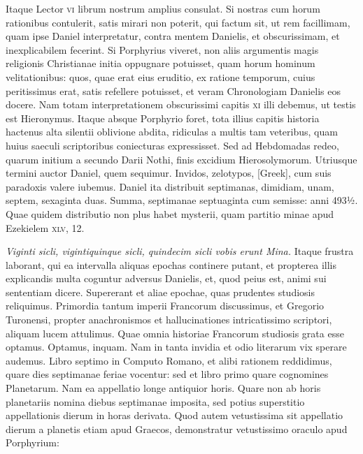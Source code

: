 \begin{parnumbers}
{}
\lnr{}Itaque
Lector \textsc{vi} librum nostrum amplius consulat.
\lnr{}Si nostras cum horum
rationibus contulerit, satis mirari non poterit, qui factum
sit, ut rem facillimam, quam ipse Daniel interpretatur, contra mentem
Danielis, et obscurissimam, et inexplicabilem fecerint.
\lnr{}Si Porphyrius
viveret, non aliis argumentis magis religionis Christianae
initia oppugnare potuisset, quam horum hominum velitationibus:
quos, quae erat eius eruditio, ex ratione temporum, cuius peritissimus
erat, satis refellere potuisset, et veram Chronologiam
Danielis eos docere.
\lnr{}Nam totam interpretationem obscurissimi
capitis \textsc{xi} illi debemus, ut testis est Hieronymus.
\lnr{}Itaque
absque Porphyrio foret, tota illius capitis historia hactenus alta
silentii oblivione abdita, ridiculas a multis tam veteribus, quam huius
saeculi scriptoribus coniecturas expressisset.
\lnr{}Sed ad Hebdomadas
redeo, quarum initium a secundo Darii Nothi, finis excidium
Hierosolymorum.
\lnr{}Utriusque termini auctor Daniel, quem sequimur.
\lnr{}Invidos, zelotypos, \textgreek{[Greek]}, cum suis paradoxis valere iubemus.
\lnr{}Daniel ita distribuit septimanas, dimidiam, unam, septem,
sexaginta duas.
\lnr{}Summa, septimanae septuaginta cum semisse: anni
493½.
\lnr{}Quae quidem distributio non plus habet mysterii, quam
partitio minae apud Ezekielem \textsc{xlv}, 12.

\textit{Viginti sicli, vigintiquinque
sicli, quindecim sicli vobis erunt Mina.}
\lnr{}Itaque frustra laborant,
qui ea intervalla aliquas epochas continere putant, et propterea
illis explicandis multa coguntur adversus Danielis, et, quod peius
est, animi sui sententiam dicere.
\lnr{}Supererant et aliae epochae, quas
prudentes studiosis reliquimus.
\lnr{}Primordia tantum imperii Francorum
discussimus, et Gregorio Turonensi, propter anachronismos
et hallucinationes intricatissimo scriptori, aliquam lucem attulimus.
\lnr{}Quae omnia historiae Francorum studiosis grata esse optamus.
\lnr{}Optamus, inquam.
\lnr{}Nam in tanta invidia et odio literarum
vix sperare audemus.
\lnr{}Libro septimo in Computo Romano, et alibi
rationem reddidimus, quare dies septimanae feriae vocentur: sed
et libro primo quare cognomines Planetarum.
\lnr{}Nam ea appellatio longe antiquior horis.
\lnr{}Quare non ab horis planetariis nomina diebus
septimanae imposita, sed potius superstitio appellationis dierum
in horas derivata.
\lnr{}Quod autem vetustissima sit appellatio dierum
a planetis etiam apud Graecos, demonstratur vetustissimo oraculo
apud Porphyrium:


\end{parnumbers}
